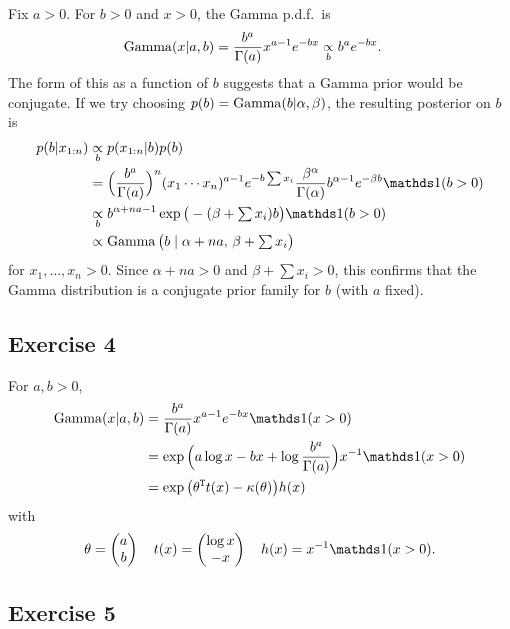 \documentclass[12pt]{article}
\begin{document}
Fix $a>0$. For $b>0$ and $x>0$, the Gamma p.d.f.\ is
\begin{align*}
\operatorname*{Gamma}(x|a,b)&=\frac{b^a}{\Gamma(a)} x^{a-1} e^{-b x}\underset{b}{\propto} b^a e^{-b x}.
\end{align*}
The form of this as a function of $b$ suggests that a Gamma prior would be conjugate. If we try choosing $p(b) =\operatorname*{Gamma}(b|\alpha,\beta)$, the resulting posterior on $b$ is
\begin{align*}
p(b|x_{1:n}) &\underset{b}{\propto} p(x_{1:n}|b) p(b)\\
& =\Big(\frac{b^a}{\Gamma(a)}\Big)^n(x_1 \cdots x_n)^{a-1}e^{-b\sum x_i}
 \frac{\beta^\alpha}{\Gamma(\alpha)} b^{\alpha-1}e^{-\beta b}\I(b>0)\\
& \underset{b}{\propto} b^{\alpha + n a-1}\exp\big(-(\beta+\textstyle\sum x_i) b\big)\I(b>0)\\
& \propto \Ga\big(b\mid \alpha + n a,\,\beta +\textstyle\sum x_i\big)
\end{align*}
for $x_1,\dotsc,x_n>0$. Since $\alpha + n a>0$ and $\beta+\textstyle\sum x_i>0$, this confirms that the Gamma distribution is a conjugate prior family for $b$ (with $a$ fixed).


\subsection*{Exercise 4}

For $a,b>0$,
\begin{align*}
\Ga(x|a,b)&=\frac{b^a}{\Gamma(a)} x^{a-1} e^{-b x}\I(x>0)\\
& = \exp\Big(a\log x-b x +\log\frac{b^a}{\Gamma(a)}\Big) x^{- 1}\I(x>0)\\
& =\exp\big(\theta^\T t(x)-\kappa(\theta)\big)h(x)
\end{align*}
with
\begin{align*}
\theta = \begin{pmatrix} a \\ b\end{pmatrix}\quad
t(x) = \begin{pmatrix}\log x \\ -x\end{pmatrix}\quad
h(x) = x^{-1}\I(x>0).
\end{align*}


\subsection*{Exercise 5}
\end{document}
